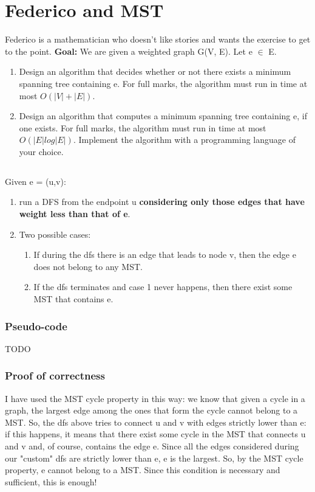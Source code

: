 \documentclass[12pt]{article}
\begin{document}
\section{Federico and MST}
Federico is a mathematician who doesn't like stories and wants the exercise to get to the point.
\newline
\textbf{Goal:} We are given a weighted graph G(V, E). Let e $\in$ E.
\begin{enumerate}
	\item Design an algorithm that decides whether or not there exists a minimum spanning tree containing e. For full marks, the algorithm must run in time at most $O(|V | + |E|)$.
	\item Design an algorithm that computes a minimum spanning tree containing e, if one exists. For full marks, the algorithm must run in time at most $O(|E| log |E|)$. Implement the algorithm with a programming language of your choice.

\end{enumerate}
\subsection{}
Given e = (u,v):
\begin{enumerate}
	\item run a DFS from the endpoint u \textbf{considering only those edges that have weight less than that of e}.
	\item Two possible cases:
	\begin{enumerate}
		\item If during the dfs there is an edge that leads to node v, then the edge e does not belong to any MST.
		\item If the dfs terminates and case 1 never happens, then there exist some MST that contains e.
	\end{enumerate}
\end{enumerate}

\subsubsection{Pseudo-code}
TODO
\subsubsection{Proof of correctness}
I have used the MST cycle property in this way: we know that given a cycle in a graph, the largest edge among the ones that form the cycle cannot belong to a MST. So, the dfs above tries to connect u and v with edges strictly lower than e: if this happens, it means that there exist some cycle in the MST that connects u and v and, of course, contains the edge e. Since all the edges considered during our "custom" dfs are strictly lower than e, e is the largest. So, by the MST cycle property, e cannot belong to a MST. Since this condition is necessary and sufficient, this is enough!
\end{document}
